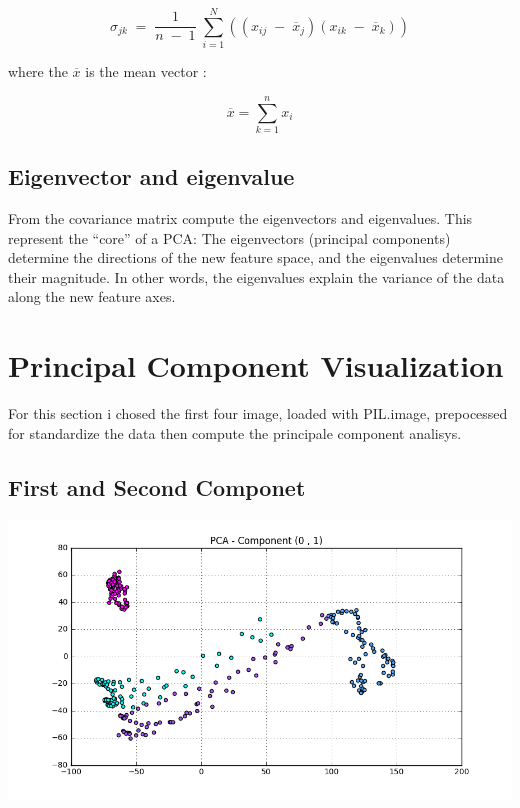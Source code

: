 \documentclass[11pt]{article}
\begin{document}
$$\sigma_{jk} \; =\; \frac{1}{n\; -\; 1}\; \sum_{i=1}^{N}{\left( \left( x_{ij}\; -\; \overline{x}_{j} \right)\left( x_{ik}\; -\; \overline{x}_{k} \right) \right)}$$

where the $\overline{x}$ is the mean vector :

$$\overline{x} = \sum\limits_{k=1}^n{x_{i}} $$



\subsection{Eigenvector and eigenvalue}
From the covariance matrix compute the eigenvectors and eigenvalues. This represent the “core” of a PCA: The eigenvectors (principal components) determine the directions of the new feature space, and the eigenvalues determine their magnitude. In other words, the eigenvalues explain the variance of the data along the new feature axes.

\section{Principal Component Visualization}
For this section i chosed the first four image, loaded with PIL.image, prepocessed for standardize the data then compute the principale component analisys.
\subsection{First and Second Componet}
\begin{center}
 \includegraphics[scale=0.5]{1}
\end{center}
\end{document}

